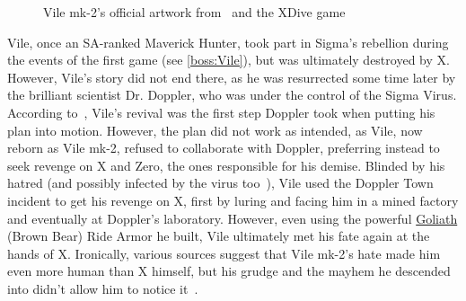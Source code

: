 \begin{figure}[htp]
	\caption{Vile mk-2's official artwork from~\cite{book:MMX_Complete_art} and the XDive game}
\end{figure}

Vile, once an SA-ranked Maverick Hunter, took part in Sigma's rebellion during the events of the first game (see \ref{boss:Vile}), but was ultimately destroyed by X. However, Vile's story did not end there, as he was resurrected some time later by the brilliant scientist Dr. Doppler, who was under the control of the Sigma Virus. According to~\cite{X3:Manual}, Vile's revival was the first step Doppler took when putting his plan into motion. However, the plan did not work as intended, as Vile, now reborn as Vile mk-2, refused to collaborate with Doppler, preferring instead to seek revenge on X and Zero, the ones responsible for his demise. Blinded by his hatred (and possibly infected by the virus too~\cite{X3:Manual}), Vile used the Doppler Town incident to get his revenge on X, first by luring and facing him in a mined factory and eventually at Doppler's laboratory. However, even using the powerful \hyperlink{vehicle:Ride_Armor_Goliath}{Goliath} (Brown Bear) Ride Armor he built, Vile ultimately met his fate again at the hands of X. Ironically, various sources suggest that Vile mk-2's  hate made him even more human than X himself, but his grudge and the mayhem he descended into didn't allow him to notice it~\cite{Xcoll1:Manual_X3,wayback:X3_resources}.

